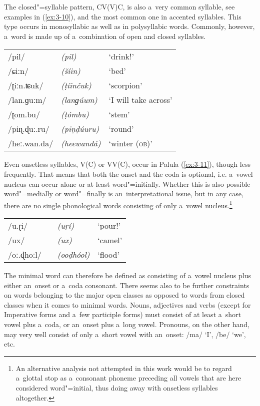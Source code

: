 The closed"=syllable pattern, CV(V)C, is also a~very common syllable, see examples in (\ref{ex:3-10}), and the most common one in accented syllables. This type occurs in monosyllabic as well as in polysyllabic words. Commonly, however, a~word is made up of a~combination of open and closed syllables. 


\begin{exe}
\extab
\label{ex:3-10}
\begin{tabular}{ l l l }
/pil/ &
\textit{(pil)} &
`drink!' \\
/ɕiːn/ &
\textit{(\v{s}íin)} &
`bed'\\
/ʈiːn.ʨuk/ &
\textit{(ṭíinčuk)} &
`scorpion'\\
/lan.ɡuːm/ &
\textit{(lanɡúum)} &
`I will take across'\\
/ʈom.bu/ &
\textit{(ṭómbu)} &
`stem'\\
/piɳ.ɖuː.ru/ &
\textit{(piṇḍúuru)} &
`round'\\
/heː.wan.da/ &
\textit{(heewandá)} &
`winter (\textsc{ob)}'\\
\end{tabular}
\end{exe}


Even onsetless syllables, V(C) or VV(C), occur in Palula (\ref{ex:3-11}), though less frequently. That means that both the onset and the coda is optional, i.e. a~vowel nucleus can occur alone or at least word"=initially. Whether this is also possible word"=medially or word"=finally is an~interpretational issue, but in any case, there are no single phonological words consisting of only a~vowel nucleus.\footnote{An alternative analysis not attempted in this work would be to regard a~glottal stop as a~consonant phoneme preceding all vowels that are here considered word"=initial, thus doing away with onsetless syllables altogether.}


\begin{exe}
\extab
\label{ex:3-11}
\begin{tabular}{ l l l }
/u.ɽi/ &
\textit{(uṛí)} &
`pour!' \\
/ux/ &
\textit{(ux)} &
`camel'\\
/oː.ɖhoːl/\ \ &
\textit{(ooḍhóol)} &
`flood'\\
\end{tabular}
\end{exe}


The minimal word can therefore be defined as consisting of a~vowel nucleus plus either an~onset or a~coda consonant. There seems also to be further constraints on words belonging to the major open classes as opposed to words from closed classes when it comes to minimal words. Nouns, adjectives and verbs (except for Imperative forms and a~few participle forms) must consist of at least a~short vowel plus a~coda, or an~onset plus a~long vowel. Pronouns, on the other hand, may very well consist of only a~short vowel with an~onset: /ma/ `I', /be/ `we', etc.


